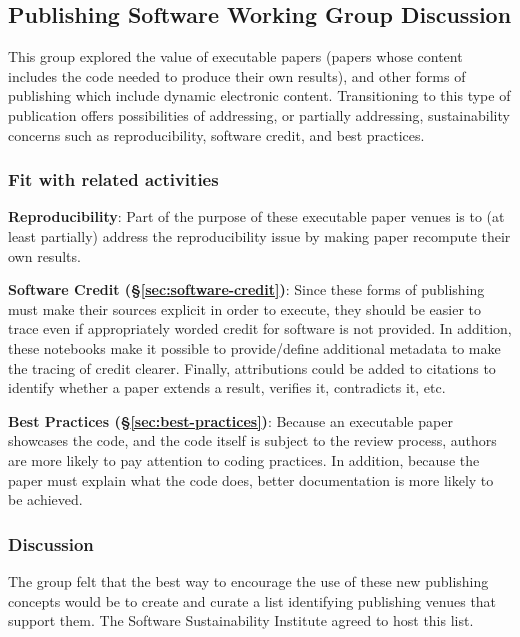\subsection{Publishing Software Working Group Discussion} \label{sec:publishing-software}

This group explored the value of executable papers (papers whose content
includes the code needed to produce their own results), and other forms of
publishing which include dynamic electronic content.
%
%
Transitioning to this type of publication offers possibilities of addressing, or
partially addressing, sustainability concerns such as reproducibility, software
credit, and best practices.

\subsubsection{Fit with related activities}

\textbf{Reproducibility}: Part of the purpose of these executable paper venues
is to (at least partially) address the reproducibility issue by making paper
recompute their own results.

\textbf{Software Credit (\S\ref{sec:software-credit})}: Since these forms of
publishing must make their sources explicit in order to execute, they should be
easier to trace even if appropriately worded credit for software is not
provided. In addition, these notebooks make it possible to provide/define
additional metadata to make the tracing of credit clearer. Finally, attributions
could be added to citations to identify whether a paper extends a result,
verifies it, contradicts it, etc.

\textbf{Best Practices (\S\ref{sec:best-practices})}: Because an executable
paper showcases the code, and the code itself is subject to the review process,
authors are more likely to pay attention to coding practices. In addition,
because the paper must explain what the code does, better documentation is
more likely to be achieved.

\subsubsection{Discussion}

The group felt that the best way to encourage the use of these new publishing
concepts would be to create and curate a list identifying publishing venues that
support them. The Software Sustainability Institute agreed to host this list.

